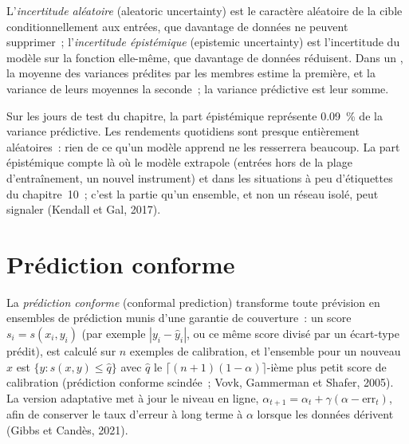 \begin{definition}\label{def:ml:probabilistic-models-and-uncertainty:aleatoric}
L'\emph{incertitude aléatoire} (aleatoric uncertainty) est le caractère aléatoire de la cible conditionnellement aux entrées, que davantage
de données ne peuvent supprimer~; l'\emph{incertitude épistémique} (epistemic uncertainty) est l'incertitude du modèle sur la
fonction elle-même, que davantage de données réduisent. Dans un , la moyenne des variances prédites par les membres estime
la première, et la variance de leurs moyennes la seconde~; la variance prédictive est leur somme.
\end{definition}

Sur les jours de test du chapitre, la part épistémique représente 0.09~\% de la variance prédictive. Les rendements quotidiens sont presque entièrement
aléatoires~: rien de ce qu'un modèle apprend ne les resserrera beaucoup. La part épistémique compte là où le modèle extrapole
(entrées hors de la plage d'entraînement, un nouvel instrument) et dans les situations à peu d'étiquettes du chapitre~10~; c'est la partie
qu'un ensemble, et non un réseau isolé, peut signaler (Kendall et Gal, 2017).

\section{Prédiction conforme}

\begin{definition}\label{def:ml:probabilistic-models-and-uncertainty:conformal}
La \emph{prédiction conforme} (conformal prediction) transforme toute prévision en ensembles de prédiction munis d'une garantie
de couverture~: un score $s_i = s(x_i, y_i)$ (par exemple $|y_i - \hat y_i|$, ou ce même score divisé par un
écart-type prédit), est calculé sur $n$ exemples de calibration, et l'ensemble pour un nouveau $x$ est $\{y: s(x, y)\le\hat q\}$ avec $\hat q$ le
$\lceil(n+1)(1 - \alpha)\rceil$-ième plus petit score de calibration (prédiction conforme scindée~; Vovk, Gammerman et Shafer, 2005). La
version adaptative met à jour le niveau en ligne, $\alpha_{t+1} = \alpha_t + \gamma(\alpha - \mathrm{err}_t)$, afin de conserver le
taux d'erreur à long terme à $\alpha$ lorsque les données dérivent (Gibbs et Candès, 2021).
\end{definition}

